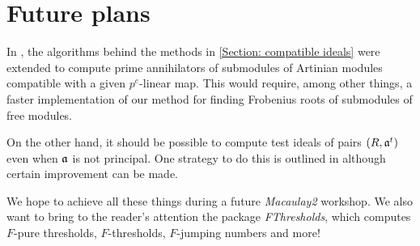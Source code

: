 \documentclass{amsart}
\begin{document}
\section{Future plans}

In \cite{KatzmanZhangAlgorithm}, the algorithms behind the methods in \autoref{Section: compatible ideals} were extended
to compute prime annihilators of submodules of Artinian modules compatible with a given $p^{e}$-linear map.
This would require, among other things, a faster implementation of our method for finding Frobenius roots of submodules of free modules.

On the other hand, it should be possible to compute test ideals of pairs $(R, \mathfrak{a}^t)$ even when $\mathfrak{a}$ is not principal.  One strategy to do this is outlined in \cite{SchwedeTuckerTestIdealsOfNonPrincipal} although certain improvement can be made.

We hope to achieve all these things during a future \emph{Macaulay2} workshop.  We also want to bring to the reader's attention the package \emph{FThresholds}, which computes $F$-pure thresholds, $F$-thresholds, $F$-jumping numbers and more!



\end{document}
